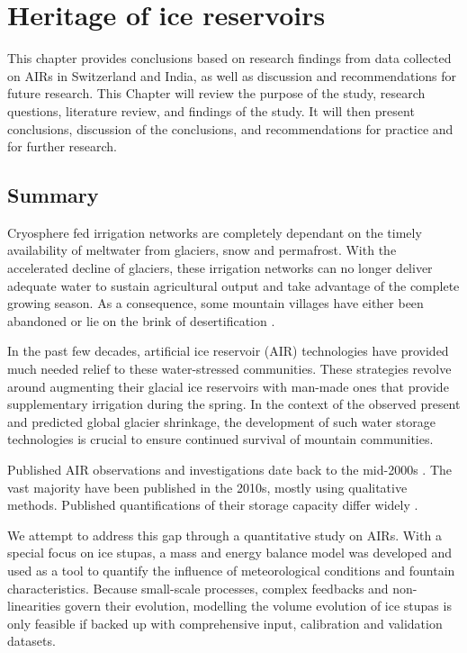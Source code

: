 \chapter{Heritage of ice reservoirs}

This chapter provides conclusions based on research findings from data collected on AIRs in Switzerland and India,
as well as discussion and recommendations for future research. This Chapter will review the purpose of the
study, research questions, literature review, and findings of the study. It will then present conclusions,
discussion of the conclusions, and recommendations for practice and for further research.

\section{Summary}

Cryosphere fed irrigation networks are completely dependant on the timely availability of meltwater from
glaciers, snow and permafrost. With the accelerated decline of glaciers, these irrigation networks can no longer
deliver adequate water to sustain agricultural output and take advantage of the complete growing season. As a
consequence, some mountain villages have either been abandoned or lie on the brink of desertification
\cite{grossmanHimalayanGlaciersMelt2015}.

In the past few decades, artificial ice reservoir (AIR) technologies have provided much needed relief to these
water-stressed communities. These strategies revolve around augmenting their glacial ice reservoirs with
man-made ones that provide supplementary irrigation during the spring. In the context of the observed present
and predicted global glacier shrinkage, the development of such water storage technologies is crucial to ensure
continued survival of mountain communities.

Published AIR observations and investigations date back to the mid-2000s \cite{tveitenGlacierGrowingLocal2007}.
The vast majority have been published in the 2010s, mostly using qualitative methods. Published quantifications
of their storage capacity differ widely \citep{baglaArtificialGlaciersHelp1998, norphelSnowWaterHarvesting2015,
nusserSociohydrologyArtificialGlaciers2019}.

We attempt to address this gap through a quantitative study on AIRs. With a special focus on ice stupas, a mass
and energy balance model was developed and used as a tool to quantify the influence of meteorological conditions
and fountain characteristics. Because small-scale processes, complex feedbacks and non-linearities govern their
evolution, modelling the volume evolution of ice stupas is only feasible if backed up with comprehensive input,
calibration and validation datasets.


